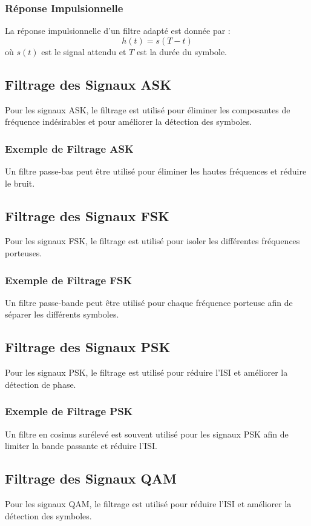 \documentclass[10pt,a4paper]{article}
\begin{document}
\subsubsection*{Réponse Impulsionnelle}
La réponse impulsionnelle d'un filtre adapté est donnée par :
\[ h(t) = s(T - t) \]
où \( s(t) \) est le signal attendu et \( T \) est la durée du symbole.

\subsection*{Filtrage des Signaux ASK}
Pour les signaux ASK, le filtrage est utilisé pour éliminer les composantes de fréquence indésirables et pour améliorer la détection des symboles.

\subsubsection*{Exemple de Filtrage ASK}
Un filtre passe-bas peut être utilisé pour éliminer les hautes fréquences et réduire le bruit.

\subsection*{Filtrage des Signaux FSK}
Pour les signaux FSK, le filtrage est utilisé pour isoler les différentes fréquences porteuses.

\subsubsection*{Exemple de Filtrage FSK}
Un filtre passe-bande peut être utilisé pour chaque fréquence porteuse afin de séparer les différents symboles.

\subsection*{Filtrage des Signaux PSK}
Pour les signaux PSK, le filtrage est utilisé pour réduire l'ISI et améliorer la détection de phase.

\subsubsection*{Exemple de Filtrage PSK}
Un filtre en cosinus surélevé est souvent utilisé pour les signaux PSK afin de limiter la bande passante et réduire l'ISI.

\subsection*{Filtrage des Signaux QAM}
Pour les signaux QAM, le filtrage est utilisé pour réduire l'ISI et améliorer la détection des symboles.
\end{document}
